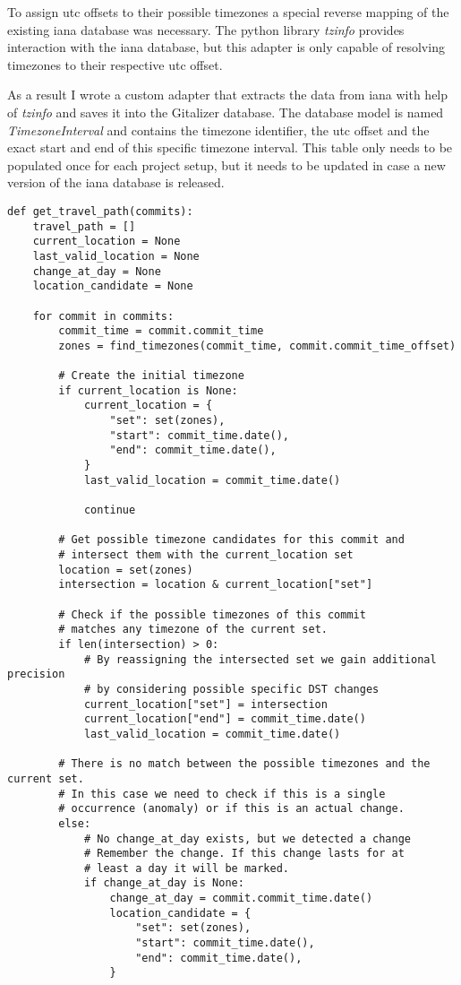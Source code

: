 To assign \ac{utc} offsets to their possible timezones a special reverse mapping of the existing \ac{iana} database was necessary.
The python library \emph{tzinfo} provides interaction with the \ac{iana} database, but this adapter is only capable of resolving timezones to their respective \ac{utc} offset.

As a result I wrote a custom adapter that extracts the data from \ac{iana} with help of \emph{tzinfo} and saves it into the Gitalizer database.
The database model is named \emph{TimezoneInterval} and contains the timezone identifier, the \ac{utc} offset and the exact start and end of this specific timezone interval.
This table only needs to be populated once for each project setup, but it needs to be updated in case a new version of the \ac{iana} database is released.


\begin{verbatim}
def get_travel_path(commits):
    travel_path = []
    current_location = None
    last_valid_location = None
    change_at_day = None
    location_candidate = None

    for commit in commits:
        commit_time = commit.commit_time
        zones = find_timezones(commit_time, commit.commit_time_offset)

        # Create the initial timezone
        if current_location is None:
            current_location = {
                "set": set(zones),
                "start": commit_time.date(),
                "end": commit_time.date(),
            }
            last_valid_location = commit_time.date()

            continue

        # Get possible timezone candidates for this commit and
        # intersect them with the current_location set
        location = set(zones)
        intersection = location & current_location["set"]

        # Check if the possible timezones of this commit
        # matches any timezone of the current set.
        if len(intersection) > 0:
            # By reassigning the intersected set we gain additional precision
            # by considering possible specific DST changes
            current_location["set"] = intersection
            current_location["end"] = commit_time.date()
            last_valid_location = commit_time.date()

        # There is no match between the possible timezones and the current set.
        # In this case we need to check if this is a single
        # occurrence (anomaly) or if this is an actual change.
        else:
            # No change_at_day exists, but we detected a change
            # Remember the change. If this change lasts for at
            # least a day it will be marked.
            if change_at_day is None:
                change_at_day = commit.commit_time.date()
                location_candidate = {
                    "set": set(zones),
                    "start": commit_time.date(),
                    "end": commit_time.date(),
                }


\end{verbatim}
